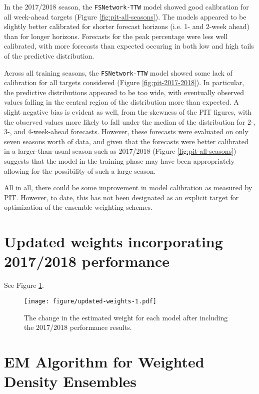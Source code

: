 \documentclass{article}\usepackage[]{graphicx}\usepackage[]{color}
\begin{document}
In the 2017/2018 season, the {\tt FSNetwork-TTW} model showed good calibration for all week-ahead targets (Figure \ref{fig:pit-all-seasons}). 
The models appeared to be slightly better calibrated for shorter forecast horizons (i.e. 1- and 2-week ahead) than for longer horizons. 
Forecasts for the peak percentage were less well calibrated, with more forecasts than expected occuring in both low and high tails of the predictive distribution.

Across all training seasons, the {\tt FSNetwork-TTW} model showed some lack of calibration for all targets considered (Figure \ref{fig:pit-2017-2018}).
In particular, the predictive distributions appeared to be too wide, with eventually observed values falling in the central region of the distribution more than expected. 
A slight negative bias is evident as well, from the skewness of the PIT figures, with the observed values more likely to fall under the median of the distribution for 2-, 3-, and 4-week-ahead forecasts.
However, these forecasts were evaluated on only seven seasons worth of data, and given that the forecasts were better calibrated in a larger-than-usual season such as 2017/2018 (Figure \ref{fig:pit-all-seasons}) suggests that the model in the training phase may have been appropriately allowing for the possibility of such a large season.

All in all, there could be some improvement in model calibration as measured by PIT. 
However, to date, this has not been designated as an explicit target for optimization of the ensemble weighting schemes.



\section{Updated weights incorporating 2017/2018 performance}

See Figure \ref{fig:updated-weights}.

\begin{figure}[htbp]
\begin{center}
\texttt{[image: figure/updated-weights-1.pdf]}
\caption{The change in the estimated weight for each model after including the 2017/2018 performance results.}
\label{fig:updated-weights}
\end{center}
\end{figure}

\clearpage

\section{EM Algorithm for Weighted Density Ensembles}
\end{document}
